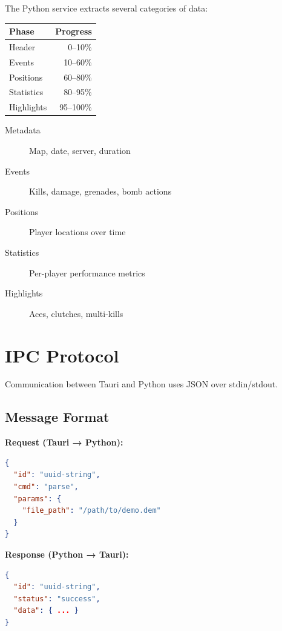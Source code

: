 The Python service extracts several categories of data:

\begin{margintable}
    \centering
    \begin{tabular}{@{}lr@{}}
        \toprule
        Phase & Progress \\
        \midrule
        Header & 0--10\% \\
        Events & 10--60\% \\
        Positions & 60--80\% \\
        Statistics & 80--95\% \\
        Highlights & 95--100\% \\
        \bottomrule
    \end{tabular}
    \caption{Parsing phases}
\end{margintable}

\begin{description}
    \item[Metadata] Map, date, server, duration
    \item[Events] Kills, damage, grenades, bomb actions
    \item[Positions] Player locations over time
    \item[Statistics] Per-player performance metrics
    \item[Highlights] Aces, clutches, multi-kills
\end{description}

\section{IPC Protocol}

Communication between Tauri and Python uses JSON over stdin/stdout.

\subsection{Message Format}

\textbf{Request (Tauri → Python):}
\begin{lstlisting}[language=json]
{
  "id": "uuid-string",
  "cmd": "parse",
  "params": {
    "file_path": "/path/to/demo.dem"
  }
}
\end{lstlisting}

\textbf{Response (Python → Tauri):}
\begin{lstlisting}[language=json]
{
  "id": "uuid-string",
  "status": "success",
  "data": { ... }
}
\end{lstlisting}

